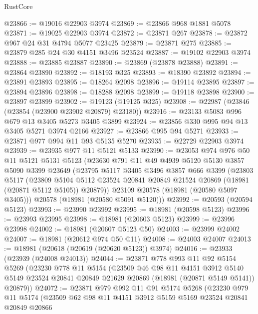\begin{lexlean}{RustCore}
\begin{coremodule}
@23866 := @19016 @22903 @3974
@23869 := @23866 @968 @1881 @5078
@23871 := @19025 @22903 @3974
@23872 := @23871 @267
@23878 := @23872 @967 @24 @31 @4794 @5077 @23425
@23879 := @23871 @275
@23885 := @23879 @285 @24 @30 @4151 @3496 @23524
@23887 := @19102 @22903 @3974
@23888 := @23885 @23887
@23890 := @23869 (@23878 @23888)
@23891 := @23864 @23890
@23892 := @18193 @325
@23893 := @18390 @23892
@23894 := @23891 @23893
@23895 := @18264 @2098
@23896 := @19114 @23895
@23897 := @23894 @23896
@23898 := @18288 @2098
@23899 := @19118 @23898
@23900 := @23897 @23899
@23902 := @19123 (@19125 @325)
@23908 := @22987 (@23846 (@23854 (@23900 @23902 @20879) @23180))
@23916 := @23133 @5083 @996 @679 @13 @3405 @5273 @3405 @3899
@23924 := @23856 @330 @995 @94 @13 @3405 @5271 @3974 @2166
@23927 := @23866 @995 @94 @5271
@23933 := @23871 @977 @994 @11 @93 @5135 @5270
@23935 := @22729 @22903 @3974
@23939 := @23935 @977 @11 @5121 @5133
@23990 := @23053
    @974
    @976
    @50
    @11
    @5121
    @5131
    @5123
    (@23630
      @791
      @11
      @49
      @4939
      @5120
      @5130
      @3857
      @5090
      @3399
      @23649
      (@23795
        @5117
        @3405
        @3496
        @3857
        @666
        @3399
        (@23803
          @5117
          (@23809
            @5104
            @5112
            @23524
            @20841
            @20849
            @21524
            @20869
            (@18981 (@20871 @5112 @5105))
            @20879))
        @23109
        @20578
        (@18981 (@20580 @5097 @3405)))
      @20578
      (@18981 (@20580 @5091 @5120)))
@23992 := @20593 (@20594 @5123)
@23993 := @23990 @23992
@23995 := @18981 (@20598 @5123)
@23996 := @23993 @23995
@23998 := @18981 (@20603 @5123)
@23999 := @23996 @23998
@24002 := @18981 (@20607 @5123 @50)
@24003 := @23999 @24002
@24007 := @18981 (@20612 @974 @50 @11)
@24008 := @24003 @24007
@24013 := @18981 (@20618 (@20619 (@20620 @5123)) @3974)
@24016 := @23933 (@23939 (@24008 @24013))
@24044 := @23871
    @778
    @993
    @11
    @92
    @5154
    @5269
    (@23230
      @778
      @11
      @5154
      (@23509
        @46
        @98
        @11
        @4151
        @3912
        @5140
        @5149
        @23524
        @20841
        @20849
        @21629
        @20869
        (@18981 (@20871 @5149 @5141))
        @20879))
@24072 := @23871
    @979
    @992
    @11
    @91
    @5174
    @5268
    (@23230
      @979
      @11
      @5174
      (@23509
        @62
        @98
        @11
        @4151
        @3912
        @5159
        @5169
        @23524
        @20841
        @20849
        @20866

\end{coremodule}
\end{lexlean}
